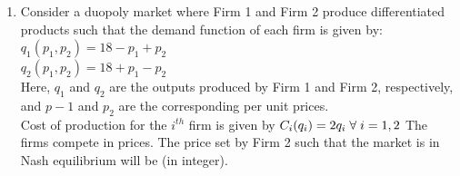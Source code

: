 \documentclass{article}
\begin{document}
\begin{enumerate}[leftmargin=*, start=45, label=Q.\arabic*.]
    \item Consider a duopoly market where Firm 1 and Firm 2 produce differentiated products such that the demand function of each firm is given by: \\
    $q_1(p_1,p_2)=18-p_1+p_2$ \\
    $q_2(p_1,p_2)=18+p_1-p_2$ \\
    Here, $q_1$ and $q_2$ are the outputs produced by Firm 1 and Firm 2, respectively, and $p-1$ and $p_2$ are the corresponding per unit prices. \\
    Cost of production for the $i^{th}$ firm is given by $C_i(q_i)=2q_i\hspace{0.1cm}\forall\hspace{0.1cm} i=1,2$ The firms compete in prices. The price set by Firm 2 such that the market is in Nash equilibrium will be \makebox[1cm]{\hrulefill} (in integer). 

    


    

\end{enumerate}
\end{document}
